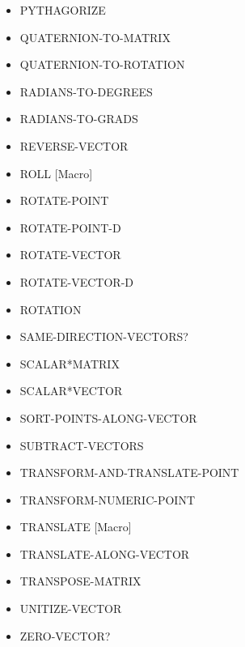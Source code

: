 \documentclass [11pt]{book}
\begin{document}
\begin{itemize}
\item {}PYTHAGORIZE

\item {}QUATERNION-TO-MATRIX

\item {}QUATERNION-TO-ROTATION

\item {}RADIANS-TO-DEGREES

\item {}RADIANS-TO-GRADS

\item {}REVERSE-VECTOR

\item {}ROLL [Macro]

\item {}ROTATE-POINT

\item {}ROTATE-POINT-D

\item {}ROTATE-VECTOR

\item {}ROTATE-VECTOR-D

\item {}ROTATION

\item {}SAME-DIRECTION-VECTORS?

\item {}SCALAR*MATRIX

\item {}SCALAR*VECTOR

\item {}SORT-POINTS-ALONG-VECTOR

\item {}SUBTRACT-VECTORS

\item {}TRANSFORM-AND-TRANSLATE-POINT

\item {}TRANSFORM-NUMERIC-POINT

\item {}TRANSLATE [Macro]

\item {}TRANSLATE-ALONG-VECTOR

\item {}TRANSPOSE-MATRIX

\item {}UNITIZE-VECTOR

\item {}ZERO-VECTOR?

\end{itemize}
\end{document}
